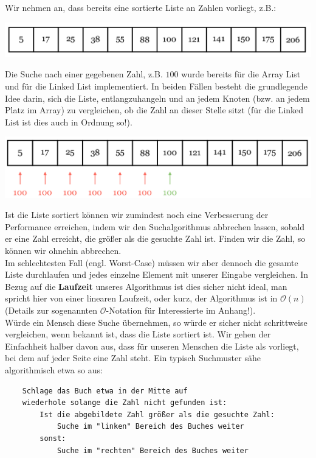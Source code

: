 \documentclass{article}
\begin{document}
Wir nehmen an, dass bereits eine sortierte Liste an Zahlen vorliegt, z.B.:
\begin{center}
    \includegraphics[scale=0.25]{../../media/search.png}
\end{center}
Die Suche nach einer gegebenen Zahl, z.B. $100$ wurde bereits für die Array List und für die Linked List implementiert. In beiden Fällen besteht die grundlegende Idee darin, sich die Liste, entlangzuhangeln und an jedem Knoten (bzw. an jedem Platz im Array) zu vergleichen, ob die Zahl an dieser Stelle sitzt (für die Linked List ist dies auch in Ordnung so!).
\begin{center}
    \includegraphics[scale=0.25]{../../media/search2.png}
\end{center}
Ist die Liste sortiert können wir zumindest noch eine Verbesserung der Performance erreichen, indem wir den Suchalgorithmus abbrechen lassen, sobald er eine Zahl erreicht, die größer als die gesuchte Zahl ist. Finden wir die Zahl, so können wir ohnehin abbrechen.\\
Im schlechtesten Fall (engl. Worst-Case) müssen wir aber dennoch die gesamte Liste durchlaufen und jedes einzelne Element mit unserer Eingabe vergleichen. In Bezug auf die \textbf{Laufzeit} unseres Algorithmus ist dies sicher nicht ideal, man spricht hier von einer linearen Laufzeit, oder kurz, der Algorithmus ist in $\mathcal{O}(n)$ (Details zur sogenannten $\mathcal{O}$-Notation für Interessierte im Anhang!). \\
Würde ein Mensch diese Suche übernehmen, so würde er sicher nicht schrittweise vergleichen, wenn bekannt ist, dass die Liste sortiert ist. Wir gehen der Einfachheit halber davon aus, dass für unseren Menschen die Liste als  vorliegt, bei dem auf jeder Seite eine Zahl steht. Ein typisch  Suchmuster sähe algorithmisch etwa so aus:
\begin{verbatim}
    Schlage das Buch etwa in der Mitte auf 
    wiederhole solange die Zahl nicht gefunden ist:
        Ist die abgebildete Zahl größer als die gesuchte Zahl:
            Suche im "linken" Bereich des Buches weiter
        sonst:
            Suche im "rechten" Bereich des Buches weiter 
\end{verbatim}
\end{document}

